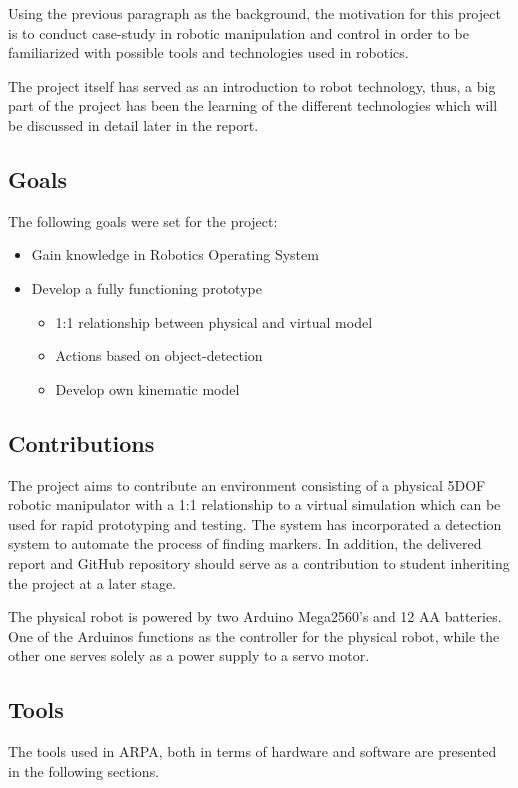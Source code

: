 \documentclass[11pt,a4paper, titlepage]{article}
\begin{document}
Using the previous paragraph as the background, the motivation for this project is to conduct case-study in robotic manipulation and control in order to be familiarized with possible tools and technologies used in robotics.

The project itself has served as an introduction to robot technology, thus, a big part of the project has been the learning of the different technologies which will be discussed in detail later in the report.

\subsection{Goals}
The following goals were set for the project:
\begin{itemize}
\item Gain knowledge in Robotics Operating System
\item Develop a fully functioning prototype
	\begin{itemize}
	\item 1:1 relationship between physical and virtual model
	\item Actions based on object-detection
	\item Develop own kinematic model	
	\end{itemize}
	
\end{itemize}

\subsection{Contributions}
The project aims to contribute an environment consisting of a physical 5DOF robotic manipulator with a 1:1 relationship to a virtual simulation which can be used for rapid prototyping and testing. The system has incorporated a detection system to automate the process of finding markers. In addition, the delivered report and GitHub repository should serve as a contribution to student inheriting the project at a later stage.

The physical robot is powered by two Arduino Mega2560's and 12 AA batteries. One of the Arduinos functions as the controller for the physical robot, while the other one serves solely as a power supply to a servo motor.

\subsection{Tools}
The tools used in ARPA, both in terms of hardware and software are presented in the following sections.
\end{document}
